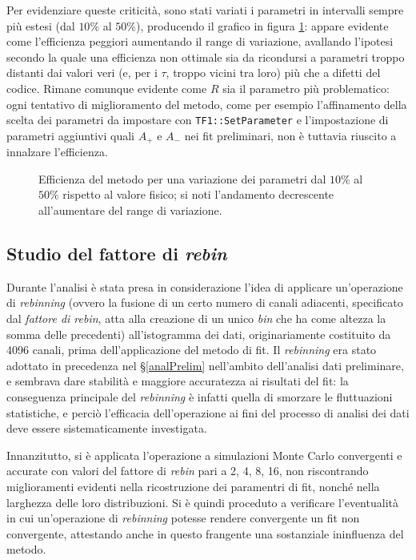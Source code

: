 \documentclass[10pt, oneside, a4paper]{article}   	%
\begin{document}
Per evidenziare queste criticità, sono stati variati i parametri in intervalli sempre più estesi (dal $10\%$ al $50\%$), producendo il grafico in figura \ref{fig:finalematrix}: appare evidente come l'efficienza peggiori aumentando il range di variazione, avallando l'ipotesi secondo la quale una efficienza non ottimale sia da ricondursi a parametri troppo distanti dai valori veri (e, per i $\tau$, troppo vicini tra loro) più che a difetti del codice. Rimane comunque evidente come $R$ sia il parametro più problematico: ogni tentativo di miglioramento del metodo, come per esempio l'affinamento della scelta dei parametri da impostare con \lstinline{TF1::SetParameter} e l'impostazione di parametri aggiuntivi quali $A_+$ e $A_-$ nei fit preliminari, non è tuttavia riuscito a innalzare l'efficienza.
%
\begin{figure}[H]
  \centering
  
  \caption{Efficienza del metodo per una variazione dei parametri dal $10 \%$ al $50\%$ rispetto al valore fisico; si noti l'andamento decrescente all'aumentare del range di variazione.}
  \label{fig:finalematrix}
\end{figure}
%
%
\subsection{Studio del fattore di \emph{rebin}} \label{parrebin}
Durante l'analisi è stata presa in considerazione l'idea di applicare un'operazione di \textit{rebinning} (ovvero la fusione di un certo numero di canali adiacenti, specificato dal \textit{fattore di rebin}, atta alla creazione di un unico \emph{bin} che ha come altezza la somma delle precedenti) all'istogramma dei dati, originariamente costituito da 4096 canali, prima dell'applicazione del metodo di fit. Il \textit{rebinning} era stato adottato in precedenza nel \S\ref{analPrelim} nell'ambito dell'analisi dati preliminare, e sembrava dare stabilità e maggiore accuratezza ai risultati del fit: la conseguenza principale del \textit{rebinning} è infatti quella di smorzare le fluttuazioni statistiche, e perciò l'efficacia dell'operazione ai fini del processo di analisi dei dati deve essere sistematicamente investigata.

Innanzitutto, si è applicata l'operazione a simulazioni Monte Carlo convergenti e accurate con valori del fattore di \emph{rebin} pari a 2, 4, 8, 16, non riscontrando miglioramenti evidenti nella ricostruzione dei paramentri di fit, nonché nella larghezza delle loro distribuzioni. Si è quindi proceduto a verificare l'eventualità in cui un'operazione di \textit{rebinning} potesse rendere convergente un fit non convergente, attestando anche in questo frangente una sostanziale ininfluenza del metodo.
\end{document}

